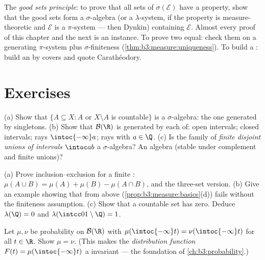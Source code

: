 \begin{method}\label{met:b3:measure:goodsets}
The \emph{good sets principle}: to prove that all sets of
$\sigma(\mathcal E)$ have a property, show that the good sets
form a $\sigma$-algebra (or a $\lambda$-system, if the property
is measure-theoretic and $\mathcal E$ is a $\pi$-system ---
then Dynkin) containing $\mathcal E$. Almost every proof of
this chapter and the next is an instance. To prove two 
equal: check them on a generating $\pi$-system plus
$\sigma$-finiteness (\cref{thm:b3:measure:uniqueness}). To
build a : build an  by covers and quote
Carath\'eodory.
\end{method}

\section{Exercises}

\begin{exercise}[$\star$]\label{exo:b3:measure:1}
(a) Show that $\{A \subseteq X : A$ or $X\setminus A$ is
countable$\}$ is a $\sigma$-algebra: the one generated by
singletons.
(b) Show that $\mathcal B(\R)$ is generated by each of: open
intervals; closed intervals; rays $\intoc{-\infty}a$; rays
with $a \in \Q$.
(c) Is the family of \emph{finite disjoint unions of intervals}
$\intoc ab$ a $\sigma$-algebra? An algebra (stable under
complement and finite unions)?
\end{exercise}

\begin{exercise}[$\star$]\label{exo:b3:measure:2}
(a) Prove inclusion--exclusion for a finite : $\mu(A\cup
B) = \mu(A) + \mu(B) - \mu(A\cap B)$, and the three-set
version.
(b) Give an example showing that  from above
(\cref{prop:b3:measure:basics}(d)) fails without the
finiteness assumption.
(c) Show that a countable set has  zero.
Deduce $\lambda(\Q) = 0$ and $\lambda(\intcc01\setminus\Q) =
1$.
\end{exercise}

\begin{exercise}[$\star\star$]\label{exo:b3:measure:3}
Let $\mu, \nu$ be probability  on $\mathcal B(\R)$
with $\mu(\intoc{-\infty}t) = \nu(\intoc{-\infty}t)$ for all
$t \in \R$. Show $\mu = \nu$. (This makes the
\emph{distribution function} $F(t) = \mu(\intoc{-\infty}t)$ a
 invariant --- the foundation of
\cref{ch:b3:probability}.)
\end{exercise}

